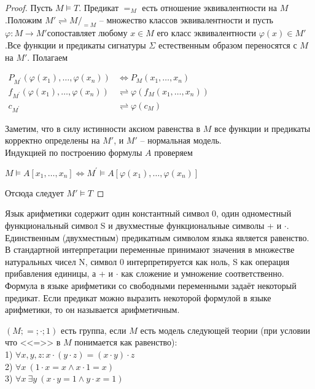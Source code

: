\begin{proof}
	Пусть $M \vDash T$. Предикат $=_M$ есть отношение эквивалентности на $M$.Положим $M'\rightleftharpoons M/_{=M}$
	-- множество классов эквивалентности и пусть $\varphi\colon M\to M'$сопоставляет любому $x\in M$ его класс
	эквивалентности $\varphi(x)\in M'$.Все функции и предикаты сигнатуры $\Sigma$ естественным образом переносятся с
	$M$ на $M'$. Полагаем
	\begin{center}
		$\begin{aligned}
			P_{M^{\prime}}\left(\varphi\left(x_{1}\right), \ldots, \varphi\left(x_{n}\right)\right) &
			\Longleftrightarrow P_{M}\left(x_{1}, \ldots, x_{n}\right) \\
			f_{M^{\prime}}\left(\varphi\left(x_{1}\right), \ldots, \varphi\left(x_{n}\right)\right) &
			\rightleftharpoons \varphi\left(f_{M}\left(x_{1}, \ldots, x_{n}\right)\right) \\
			c_{M^{\prime}} & \rightleftharpoons \varphi\left(c_{M}\right)
		\end{aligned}$
	\end{center}
	Заметим, что в силу истинности аксиом равенства в $M$ все функции и предикаты корректно определены на $M'$, и
	$M'$ -- нормальная модель.\\
	Индукцией по построению формулы $A$ проверяем
	\begin{center}
		$M \vDash A\left[x_{1}, \ldots, x_{n}\right] \Longleftrightarrow M^{\prime} \vDash
		A\left[\varphi\left(x_{1}\right), \ldots, \varphi\left(x_{n}\right)\right]$
	\end{center}
	Отсюда следует $M'\vDash T$
\end{proof}
\begin{example}
	Язык арифметики содержит один константный символ 0, один одноместный функциональный символ S и двухместные
	функциональные символы + и $\cdot$. Единственным (двухместным) предикатным символом языка является равенство. В
	стандартной интерпретации переменные принимают значения в множестве натуральных чисел N, символ 0
	интерпретируется как ноль, S как операция прибавления единицы, а + и $\cdot$ как сложение и умножение
	соответственно. Формула в языке арифметики со свободными переменными задаёт некоторый предикат. Если предикат
	можно выразить некоторой формулой в языке арифметики, то он называется арифметичным. 
\end{example}
\begin{example}
	$(M;=;\cdot;1)$ есть группа, если $M$ есть модель следующей теории (при условии что <<=>> в $M$ понимается как
	равенство):\\
	1) $\forall x,y,z: x\cdot(y\cdot z)=(x\cdot y)\cdot z$\\
	2) $\forall x \ (1 \cdot x=x \wedge x \cdot 1=x)$\\
	3) $\forall x \ \exists y \ (x \cdot y=1 \wedge y \cdot x=1)$\\
\end{example}
